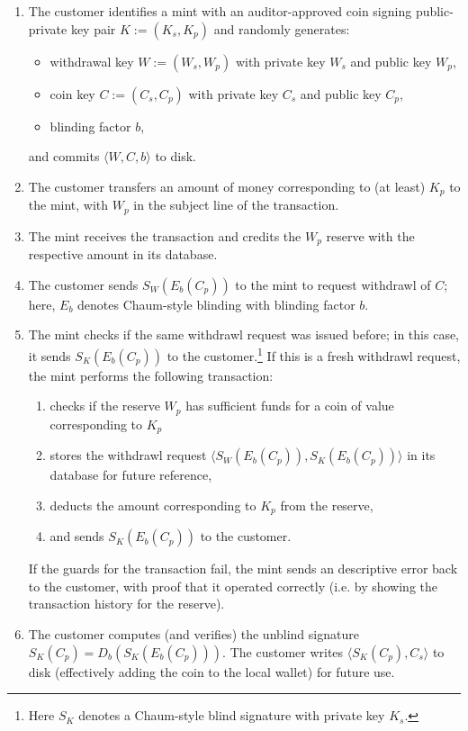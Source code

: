 \documentclass{llncs}
\begin{document}
\begin{enumerate}
  \item The customer identifies a mint with an auditor-approved
        coin signing public-private key pair $K := (K_s, K_p)$
        and randomly generates:
        \begin{itemize}
           \item withdrawal key $W := (W_s,W_p)$ with private key $W_s$ and public key $W_p$,
           \item coin key $C := (C_s,C_p)$ with private key $C_s$ and public key $C_p$,
           \item blinding factor $b$,
        \end{itemize}
        and commits $\langle W, C, b \rangle$ to disk.
  \item The customer transfers an amount of money corresponding to (at least) $K_p$ to the mint, with $W_p$ in the subject line of the transaction.
  \item The mint receives the transaction and credits the $W_p$ reserve with the respective amount in its database.
  \item The customer sends $S_W(E_b(C_p))$ to the mint to request withdrawl of $C$; here, $E_b$ denotes Chaum-style blinding with blinding factor $b$.
  \item The mint checks if the same withdrawl request was issued before; in this case, it sends $S_{K}(E_b(C_p))$ to the customer.\footnote{Here $S_K$
        denotes a Chaum-style blind signature with private key $K_s$.}
        If this is a fresh withdrawl request, the mint performs the following transaction:
        \begin{enumerate}
           \item checks if the reserve $W_p$ has sufficient funds for a coin of value corresponding to $K_p$
           \item stores the withdrawl request $\langle S_W(E_b(C_p)), S_K(E_b(C_p)) \rangle$ in its database for future reference,
           \item deducts the amount corresponding to $K_p$ from the reserve,
           \item and sends $S_{K}(E_b(C_p))$ to the customer.
        \end{enumerate}
        If the guards for the transaction fail, the mint sends an descriptive error back to the customer,
        with proof that it operated correctly (i.e. by showing the transaction history for the reserve).
  \item The customer computes (and verifies) the unblind signature $S_K(C_p) = D_b(S_K(E_b(C_p)))$.
        The customer writes $\langle S_K(C_p), C_s \rangle$ to disk (effectively adding the coin to the
        local wallet) for future use.
\end{enumerate}
\end{document}
